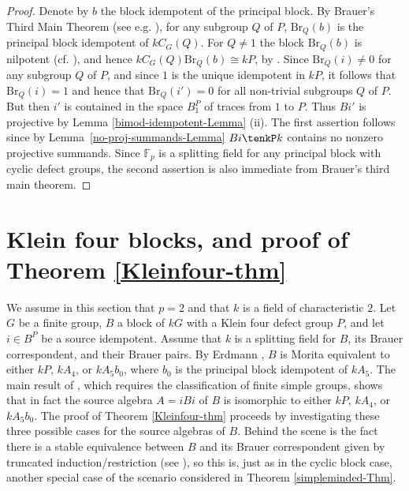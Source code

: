 \documentclass{amsart}
\theoremstyle{plain}\newtheorem{Theorem}{Theorem}[section]
\theoremstyle{plain}\newtheorem{Conjecture}[Theorem]{Conjecture}
\theoremstyle{plain}\newtheorem{Corollary}[Theorem]{Corollary}
\theoremstyle{plain}\newtheorem{Lemma}[Theorem]{Lemma}
\theoremstyle{plain}\newtheorem{Proposition}[Theorem]{Proposition}
\theoremstyle{definition}\newtheorem{Definition}[Theorem]{Definition}
\theoremstyle{definition}\newtheorem{Example}[Theorem]{Example}
\theoremstyle{definition}\newtheorem{Examples}[Theorem]{Examples}
\theoremstyle{definition}\newtheorem{Exercise}[Theorem]{Exercise}
\theoremstyle{definition}\newtheorem{Notation}[Theorem]{Notation}
\theoremstyle{definition}\newtheorem{Remark}[Theorem]{Remark}
\theoremstyle{definition}\newtheorem{Remarks}[Theorem]{Remarks}
\theoremstyle{plain}\newtheorem{Statement}[Theorem]{}
\def\Br{\mathrm{Br}}                 \def\ten{\otimes}
\begin{document}
\begin{proof}
Denote by $b$ the block idempotent of the principal block.  
By Brauer's Third Main Theorem (see e.g. 
\cite[Theorem 6.3.14]{LiBookII}),  for any subgroup $Q$ of $P$, $\Br_Q(b)$ is 
the principal block idempotent of  $kC_G(Q)$.  For $Q\neq 1$ 
the block  $\Br_Q(b)$ is  nilpotent  (cf. \cite[Lemma 10.5.2]{LiBookII}), and hence
$kC_G(Q)\Br_Q(b)\cong kP$, by \cite[Corollary 8.11.6]{LiBookII}. 
Since $\Br_Q(i)\neq 0$ for any subgroup $Q$
of $P$, and since $1$ is the unique idempotent in $kP$, it follows that
$\Br_Q(i)=1$ and hence that $\Br_Q(i')=0$ for all non-trivial subgroups $Q$ of 
$P$. But then $i'$ is contained in the space $B_1^P$ of traces from $1$ to $P$. 
Thus $Bi'$ is projective by  Lemma  \ref{bimod-idempotent-Lemma} (ii).  
The  first assertion  follows since  by  Lemma~\ref{no-proj-summands-Lemma} 
$Bi\tenkP k$  contains no nonzero projective summands.   Since ${\mathbb F}_p$ 
is a splitting field for any principal  block  with cyclic defect groups, the  second 
assertion is  also immediate from Brauer's third main theorem.
 \end{proof}
 
 

\section{Klein four blocks, and proof of Theorem \ref{Kleinfour-thm}} 
\label{Kleinfour-section} %

We assume in this section that $p=2$ and that $k$ is a field of characteristic $2$.
Let $G$ be a finite
group, $B$ a block of $kG$ with a Klein four defect group $P$, and let $i\in B^P$
be a source idempotent. Assume that $k$ is a splitting field for $B$, its Brauer
correspondent, and their Brauer pairs.
By Erdmann \cite{Erdmann82}, $B$ is Morita equivalent
to either $kP$, $kA_4$, or $kA_5b_0$, where $b_0$ is the principal block idempotent
of $kA_5$.
The main result of \cite{CEKL}, which requires the classification of finite simple groups,
shows that in fact the source algebra $A=iBi$  of $B$ is isomorphic to either 
$kP$, $kA_4$, or $kA_5b_0$. 
The proof of Theorem \ref{Kleinfour-thm} proceeds by investigating these three
possible cases for the source algebras of $B$. Behind the scene is the fact there
is a stable equivalence between $B$ and its Brauer correspondent given by
truncated induction/restriction (see \cite[Section 12.2]{LiBookII}), so this is, 
just as in the cyclic block case, another special case of the scenario considered in 
Theorem \ref{simpleminded-Thm}.
\end{document}
